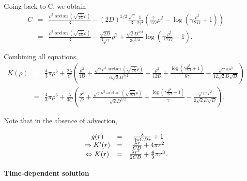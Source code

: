 \documentclass[12pt,english]{article}
\begin{document}
Going back to C, we obtain 
\begin{equation}
\begin{array}{ccc}
C & = & \frac{\rho^{3}\arctan(\sqrt{\frac{\gamma}{2D}}\rho)}{3}-\left(2D\right)^{3/2}\frac{\sqrt{\gamma}}{3}\frac{1}{2\gamma^{2}}\left(\frac{\gamma}{2D}\rho^{2}-\log(\gamma\frac{\rho^{2}}{2D}+1)\right)\\
 & = & \frac{\rho^{3}\arctan(\sqrt{\frac{\gamma}{2D}}\rho)}{3}-\frac{\sqrt{2D}}{6\sqrt{\gamma}}\rho^{2}+\frac{\sqrt{2}D^{3/2}}{3\gamma^{3/2}}\log(\gamma\frac{\rho^{2}}{2D}+1).
\end{array}
\end{equation}

Combining all equations, 
\begin{equation}
\begin{array}{ccc}
K(\rho) & = & \frac{4}{3}\pi\rho^{3}+\frac{2\lambda}{C}\left(\frac{\rho^{2}}{4D}+\frac{\sqrt{\gamma}\rho^{3}\arctan(\sqrt{\frac{\gamma}{2D}}\rho)}{6\sqrt{2}D^{3/2}}-\frac{\rho^{2}}{12D}+\frac{\log\left(\gamma\frac{\rho^{2}}{2D}+1\right)}{6\gamma}-\frac{\sqrt{\gamma}\pi\rho^{3}}{12\sqrt{2}D\sqrt{D}}\right)\\
 & = & \frac{4}{3}\pi\rho^{3}+\frac{\lambda}{3C}\left(\frac{\rho^{2}}{D}+\frac{\sqrt{\gamma}\rho^{3}\arctan(\sqrt{\frac{\gamma}{2D}}\rho)}{\sqrt{2}D^{3/2}}+\frac{\log\left(\gamma\frac{\rho^{2}}{2D}+1\right)}{\gamma}-\frac{\sqrt{\gamma}\pi\rho^{3}}{2\sqrt{2}D\sqrt{D}}\right).
\end{array}\label{eq:K_intra_adv_app}
\end{equation}

Note that in the absence of advection,

\begin{equation}
\begin{array}{ccc}
g(r) & = & \frac{\lambda}{4\pi CDr}+1\\
\Rightarrow K'(r) & = & \frac{\lambda r}{CD}+4\text{\ensuremath{\pi r^{2}}}\\
\Leftrightarrow K(r) & = & \frac{\lambda r^{2}}{2CD}+\frac{4}{3}\pi r^{3}.
\end{array}\label{eq:K_intra_no_adv_steady_app}
\end{equation}


\paragraph{Time-dependent solution}
\end{document}

